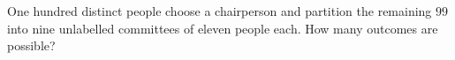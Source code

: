 One hundred distinct people choose a chairperson and partition the remaining $99$ into nine unlabelled committees of eleven people each. How many outcomes are possible?
